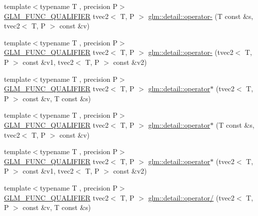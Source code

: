 \begin{DoxyCompactItemize}
\item 
{\footnotesize template$<$typename T , precision P$>$ }\\\hyperlink{setup_8hpp_a33fdea6f91c5f834105f7415e2a64407}{G\+L\+M\+\_\+\+F\+U\+N\+C\+\_\+\+Q\+U\+A\+L\+I\+F\+I\+ER} tvec2$<$ T, P $>$ \hyperlink{namespaceglm_1_1detail_a8c267cbd2328aae302254f4229971520}{glm\+::detail\+::operator-\/} (T const \&s, tvec2$<$ T, P $>$ const \&v)
\item 
{\footnotesize template$<$typename T , precision P$>$ }\\\hyperlink{setup_8hpp_a33fdea6f91c5f834105f7415e2a64407}{G\+L\+M\+\_\+\+F\+U\+N\+C\+\_\+\+Q\+U\+A\+L\+I\+F\+I\+ER} tvec2$<$ T, P $>$ \hyperlink{namespaceglm_1_1detail_a963a5196c6d5d41eb6124f8935cfc262}{glm\+::detail\+::operator-\/} (tvec2$<$ T, P $>$ const \&v1, tvec2$<$ T, P $>$ const \&v2)
\item 
{\footnotesize template$<$typename T , precision P$>$ }\\\hyperlink{setup_8hpp_a33fdea6f91c5f834105f7415e2a64407}{G\+L\+M\+\_\+\+F\+U\+N\+C\+\_\+\+Q\+U\+A\+L\+I\+F\+I\+ER} tvec2$<$ T, P $>$ \hyperlink{namespaceglm_1_1detail_ae25db2d532cebfe5b7a33bd2ae302dea}{glm\+::detail\+::operator$\ast$} (tvec2$<$ T, P $>$ const \&v, T const \&s)
\item 
{\footnotesize template$<$typename T , precision P$>$ }\\\hyperlink{setup_8hpp_a33fdea6f91c5f834105f7415e2a64407}{G\+L\+M\+\_\+\+F\+U\+N\+C\+\_\+\+Q\+U\+A\+L\+I\+F\+I\+ER} tvec2$<$ T, P $>$ \hyperlink{namespaceglm_1_1detail_abb95bc01c59e23357e95c16d80dc3674}{glm\+::detail\+::operator$\ast$} (T const \&s, tvec2$<$ T, P $>$ const \&v)
\item 
{\footnotesize template$<$typename T , precision P$>$ }\\\hyperlink{setup_8hpp_a33fdea6f91c5f834105f7415e2a64407}{G\+L\+M\+\_\+\+F\+U\+N\+C\+\_\+\+Q\+U\+A\+L\+I\+F\+I\+ER} tvec2$<$ T, P $>$ \hyperlink{namespaceglm_1_1detail_a6f28edd6841fb1d1c9d592ef464cf30a}{glm\+::detail\+::operator$\ast$} (tvec2$<$ T, P $>$ const \&v1, tvec2$<$ T, P $>$ const \&v2)
\item 
{\footnotesize template$<$typename T , precision P$>$ }\\\hyperlink{setup_8hpp_a33fdea6f91c5f834105f7415e2a64407}{G\+L\+M\+\_\+\+F\+U\+N\+C\+\_\+\+Q\+U\+A\+L\+I\+F\+I\+ER} tvec2$<$ T, P $>$ \hyperlink{namespaceglm_1_1detail_a4a1a58bcfed3537bda78819084cc83d2}{glm\+::detail\+::operator/} (tvec2$<$ T, P $>$ const \&v, T const \&s)
\item 

\end{DoxyCompactItemize}
